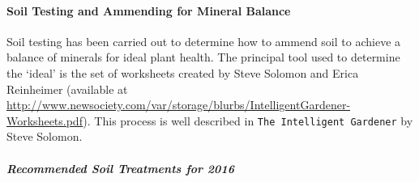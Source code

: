 \paragraph{Soil Testing and Ammending for Mineral
Balance}\label{soil-testing-and-ammending-for-mineral-balance}

Soil testing has been carried out to determine how to ammend soil to
achieve a balance of minerals for ideal plant health. The principal tool
used to determine the `ideal' is the set of worksheets created by Steve
Solomon and Erica Reinheimer (available at
\url{http://www.newsociety.com/var/storage/blurbs/IntelligentGardener-Worksheets.pdf}).
This process is well described in \texttt{The Intelligent Gardener} by
Steve Solomon.

\subparagraph{Recommended Soil Treatments for
2016}\label{recommended-soil-treatments-for-2016}

